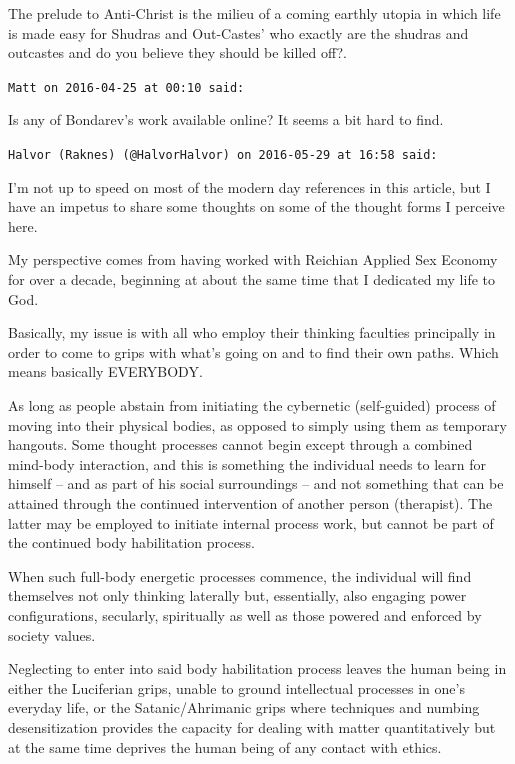 \begin{footnotesize}
\begin{sffamily}
The prelude to Anti-Christ is the milieu of a coming earthly utopia in which life is made easy for Shudras and Out-Castes' who exactly are the shudras and outcastes and do you believe they should be killed off?.

\hfill

\texttt{Matt on 2016-04-25 at 00:10 said:}

Is any of Bondarev's work available online? It seems a bit hard to find.

\hfill

\texttt{Halvor (Raknes) (@HalvorHalvor) on 2016-05-29 at 16:58 said:}

I'm not up to speed on most of the modern day references in this article, but I have an impetus to share some thoughts on some of the thought forms I perceive here.

My perspective comes from having worked with Reichian Applied Sex Economy for over a decade, beginning at about the same time that I dedicated my life to God.

Basically, my issue is with all who employ their thinking faculties principally in order to come to grips with what's going on and to find their own paths. Which means basically EVERYBODY.

As long as people abstain from initiating the cybernetic (self-guided) process of moving into their physical bodies, as opposed to simply using them as temporary hangouts. Some thought processes cannot begin except through a combined mind-body interaction, and this is something the individual needs to learn for himself -- and as part of his social surroundings -- and not something that can be attained through the continued intervention of another person (therapist). The latter may be employed to initiate internal process work, but cannot be part of the continued body habilitation process.

When such full-body energetic processes commence, the individual will find themselves not only thinking laterally but, essentially, also engaging power configurations, secularly, spiritually as well as those powered and enforced by society values.

Neglecting to enter into said body habilitation process leaves the human being in either the Luciferian grips, unable to ground intellectual processes in one's everyday life, or the Satanic/Ahrimanic grips where techniques and numbing desensitization provides the capacity for dealing with matter quantitatively but at the same time deprives the human being of any contact with ethics.


\end{sffamily}
\end{footnotesize}
